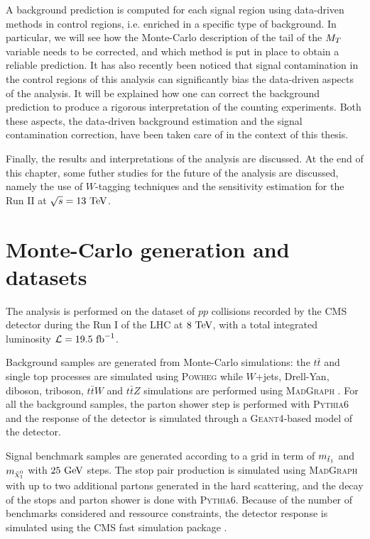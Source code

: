     A background prediction is computed for each signal region using data-driven methods
    in control regions, i.e. enriched in a specific type of background. In particular, we
    will see how the Monte-Carlo description of the tail of the $M_T$ variable needs to be
    corrected, and which method is put in place to obtain a reliable prediction.
    It has also recently been noticed that signal contamination in the control regions of
    this analysis can significantly bias the data-driven aspects of the analysis. It will
    be explained how one can correct the background prediction to produce a rigorous
    interpretation of the counting experiments. Both these aspects, the data-driven
    background estimation and the signal contamination correction, have been taken care
    of in the context of this thesis.

    Finally, the results and interpretations of the analysis are discussed. At the end
    of this chapter, some futher studies for the future of the analysis are discussed,
    namely the use of $W$-tagging techniques and the sensitivity estimation for the Run II
    at $\sqrt{s} = 13~\text{TeV}$.

    \section{Monte-Carlo generation and datasets}

    The analysis is performed on the dataset of $pp$ collisions recorded by the CMS detector
    during the Run I of the LHC at $8~\text{TeV}$, with a total integrated luminosity
    $\mathcal{L} = 19.5~\text{fb}^{-1}$.

    Background samples are generated from Monte-Carlo simulations: the $t\bar{t}$ and
    single top processes are simulated using \textsc{Powheg} \cite{Powheg} while $W$+jets,
    Drell-Yan, diboson, triboson, $t\bar{t}W$ and $t\bar{t}Z$ simulations are performed
    using \textsc{MadGraph} \cite{Madgraph}. For all the background samples, the
    parton shower step is performed with \textsc{Pythia}6 \cite{Pythia} and the response of
    the detector is simulated through a \textsc{Geant4}-based model of the detector.

    Signal benchmark samples are generated according to a grid in term of $m_{\tilde{t}_1}$
    and $m_{\tilde{\chi}_1^0}$ with $25~\text{GeV}$ steps. The stop pair production is simulated
    using \textsc{MadGraph} with up to two additional partons generated in the hard scattering,
    and the decay of the stops and parton shower is done with \textsc{Pythia6}. Because
    of the number of benchmarks considered and ressource constraints, the detector
    response is simulated using the CMS fast simulation package \cite{Fastsim}.

